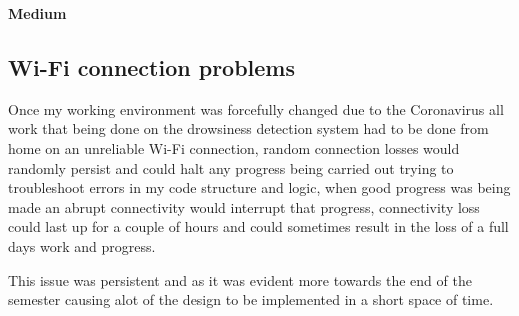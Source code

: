 \item \textbf{Medium}
\item \subsection{ \textbf{ Wi-Fi connection problems } }																																									\item Once my working environment was forcefully changed due to the Coronavirus all work that being done on the drowsiness detection system had to be done from home on an unreliable Wi-Fi connection, random connection losses would randomly persist and could halt any progress being carried out trying to troubleshoot errors in my code structure and logic, when good progress was being made an abrupt connectivity would interrupt that progress, connectivity loss could last up for a couple of hours and  could sometimes result in the loss of a full days work and progress.	                                                            																																                                              \item This issue was persistent and as it was evident more towards the end of the semester causing alot of the design to be implemented in a short space of time.												
